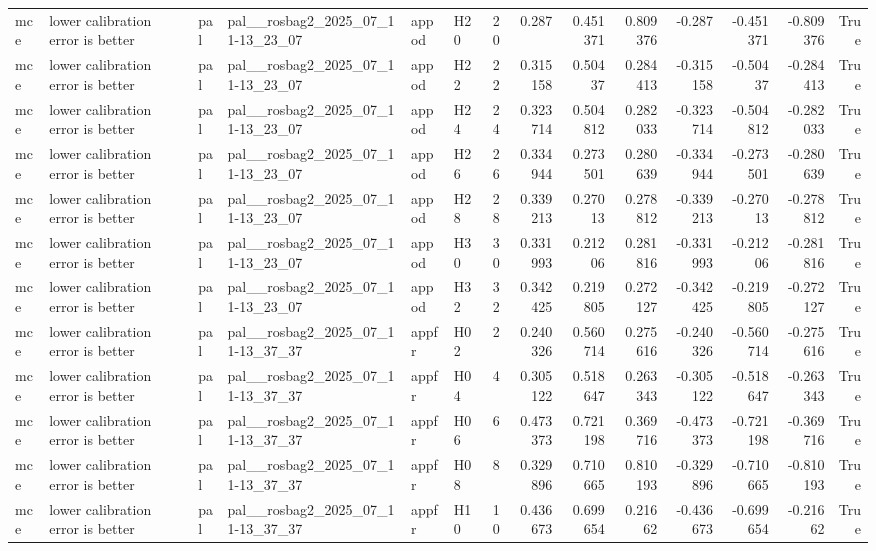 \begin{longtable}{llllllrrrrrrrr}
mce & lower calibration error is better & pal & pal\_\_rosbag2\_2025\_07\_11-13\_23\_07 & appod & H20 & 20 & 0.287 & 0.451371 & 0.809376 & -0.287 & -0.451371 & -0.809376 & True \\
mce & lower calibration error is better & pal & pal\_\_rosbag2\_2025\_07\_11-13\_23\_07 & appod & H22 & 22 & 0.315158 & 0.50437 & 0.284413 & -0.315158 & -0.50437 & -0.284413 & True \\
mce & lower calibration error is better & pal & pal\_\_rosbag2\_2025\_07\_11-13\_23\_07 & appod & H24 & 24 & 0.323714 & 0.504812 & 0.282033 & -0.323714 & -0.504812 & -0.282033 & True \\
mce & lower calibration error is better & pal & pal\_\_rosbag2\_2025\_07\_11-13\_23\_07 & appod & H26 & 26 & 0.334944 & 0.273501 & 0.280639 & -0.334944 & -0.273501 & -0.280639 & True \\
mce & lower calibration error is better & pal & pal\_\_rosbag2\_2025\_07\_11-13\_23\_07 & appod & H28 & 28 & 0.339213 & 0.27013 & 0.278812 & -0.339213 & -0.27013 & -0.278812 & True \\
mce & lower calibration error is better & pal & pal\_\_rosbag2\_2025\_07\_11-13\_23\_07 & appod & H30 & 30 & 0.331993 & 0.21206 & 0.281816 & -0.331993 & -0.21206 & -0.281816 & True \\
mce & lower calibration error is better & pal & pal\_\_rosbag2\_2025\_07\_11-13\_23\_07 & appod & H32 & 32 & 0.342425 & 0.219805 & 0.272127 & -0.342425 & -0.219805 & -0.272127 & True \\
mce & lower calibration error is better & pal & pal\_\_rosbag2\_2025\_07\_11-13\_37\_37 & appfr & H02 & 2 & 0.240326 & 0.560714 & 0.275616 & -0.240326 & -0.560714 & -0.275616 & True \\
mce & lower calibration error is better & pal & pal\_\_rosbag2\_2025\_07\_11-13\_37\_37 & appfr & H04 & 4 & 0.305122 & 0.518647 & 0.263343 & -0.305122 & -0.518647 & -0.263343 & True \\
mce & lower calibration error is better & pal & pal\_\_rosbag2\_2025\_07\_11-13\_37\_37 & appfr & H06 & 6 & 0.473373 & 0.721198 & 0.369716 & -0.473373 & -0.721198 & -0.369716 & True \\
mce & lower calibration error is better & pal & pal\_\_rosbag2\_2025\_07\_11-13\_37\_37 & appfr & H08 & 8 & 0.329896 & 0.710665 & 0.810193 & -0.329896 & -0.710665 & -0.810193 & True \\
mce & lower calibration error is better & pal & pal\_\_rosbag2\_2025\_07\_11-13\_37\_37 & appfr & H10 & 10 & 0.436673 & 0.699654 & 0.21662 & -0.436673 & -0.699654 & -0.21662 & True \\

\end{longtable}
